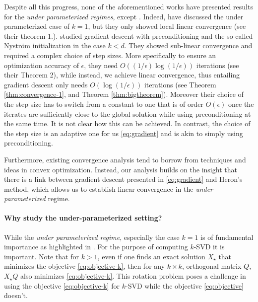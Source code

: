 Despite all this progress, none of the aforementioned works have presented results for the \emph{under parameterized regimes}, except \cite{chi2019nonconvex,li2024crucial}. Indeed, \cite{chi2019nonconvex} have discussed the under parameterized case of $k = 1$, but they only showed local linear convergence (see their theorem 1.). \cite{li2024crucial} studied gradient descent with preconditioning and the so-called Nyström initialization in the case $k < d$. They showed sub-linear convergence and required a complex choice of step sizes. More specifically to ensure an optimization accuracy of $\epsilon$, they need $O((1/\epsilon)\log(1/\epsilon))$ iterations (see their Theorem 2), while instead, we achieve linear convergence, thus entailing gradient descent only needs $O(\log(1/\epsilon))$ iterations (see Theorem \ref{thm:convergence-1}, and Theorem \ref{thm:bigtheorem}). Moreover their choice of the step size has to switch from a constant to one that is of order $O(\epsilon)$ once the iterates are sufficiently close to the global solution while using preconditioning at the same time. It is not clear how this can be achieved. In contrast, the choice of the step size is an adaptive one for us \eqref{eq:gradient} and is akin to simply using preconditioning.


Furthermore, existing convergence analysis tend to borrow from techniques and ideas in convex optimization. Instead, our analysis builds on the insight that there is a link between gradient descent presented in \eqref{eq:gradient} and Heron's method, which allows us to establish linear convergence in the \emph{under-parameterized} regime.  


\paragraph{Why study the under-parameterized setting?} While the \emph{under parameterized regime}, especially the case $k = 1$ is of fundamental importance as highlighted in \cite{chi2019nonconvex}. For the purpose of computing $k$-SVD it is important. Note that for $k > 1$, even if one finds an exact solution $X_\star$ that minimizes the objective \eqref{eq:objective-k}, then for any $k \times k$, orthogonal matrix $Q$, $X_\star Q$ also minimizes \eqref{eq:objective-k}. This rotation problem poses a challenge in using the objective \eqref{eq:objective-k} for $k$-SVD while the objective \eqref{eq:objective} doesn't.
